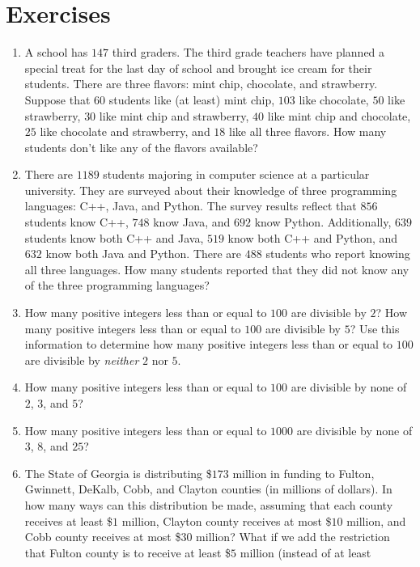 \section{Exercises}

\begin{enumerate}
\item A school has $147$ third graders. The third grade teachers have
  planned a special treat for the last day of school and brought ice
  cream for their students. There are three flavors: mint chip,
  chocolate, and strawberry. Suppose that $60$ students like (at
  least) mint chip, $103$ like chocolate, $50$ like strawberry, $30$
  like mint chip and strawberry, $40$ like mint chip and chocolate,
  $25$ like chocolate and strawberry, and $18$ like all three
  flavors. How many students don't like any of the flavors available?
\item There are $1189$ students majoring in computer science at a
  particular university. They are surveyed about their knowledge of
  three programming languages: C++, Java, and Python. The survey
  results reflect that $856$ students know C++, $748$ know Java, and
  $692$ know Python. Additionally, $639$ students know both C++ and
  Java, $519$ know both C++ and Python, and $632$ know both Java and
  Python. There are $488$ students who report knowing all three
  languages. How many students reported that they did not know any of
  the three programming languages?
\item How many positive integers less than or equal to $100$ are
  divisible by $2$? How many positive integers less than or equal to
  $100$ are divisible by $5$? Use this information to determine how
  many positive integers less than or equal to $100$ are divisible by
  \emph{neither} $2$ nor $5$.
\item How many positive integers less than or equal to $100$ are
  divisible by none of $2$, $3$, and $5$?
\item How many positive integers less than or equal to $1000$ are
  divisible by none of $3$, $8$, and $25$?
\item The State of Georgia is distributing \$$173$ million in funding
  to Fulton, Gwinnett, DeKalb, Cobb, and Clayton counties (in millions
  of dollars). In how many ways can this distribution be made,
  assuming that each county receives at least \$$1$ million, Clayton
  county receives at most \$$10$ million, and Cobb county receives at
  most \$$30$ million? What if we add the restriction that Fulton
  county is to receive at least \$$5$ million (instead of at least

\end{enumerate}
